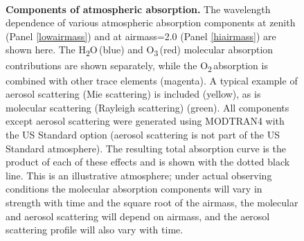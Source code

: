 \documentclass[12pt,preprint]{aastex}
\newcommand{\water}   {H\textsubscript{2}O}
\newcommand{\ozone}    {O\textsubscript{3}}
\newcommand{\oxy}     {O\textsubscript{2}}
\begin{document}
\begin{figure}[htpb]
\centering
{}\\
\vspace{-10pt}
\caption{{\small
{\bf Components of atmospheric absorption.} The wavelength dependence
of  various atmospheric absorption components at zenith
(Panel \ref{lowairmass}) and at airmass=2.0 (Panel \ref{hiairmass}) are shown here.  The \water\,(blue) and
\ozone\,(red) molecular absorption contributions are shown separately,
while the \oxy\,absorption is combined with other trace elements
(magenta). A typical example of aerosol scattering (Mie scattering) is
included (yellow), as is molecular scattering (Rayleigh scattering)
(green). All components except aerosol scattering were generated using
MODTRAN4 with the US Standard option (aerosol scattering is not part
of the US Standard atmosphere). The resulting total absorption curve
is the product of each of these effects and is shown with the dotted
black line. This is an illustrative atmosphere; under actual observing
conditions the molecular absorption components will vary in strength
with time and the square root of the airmass, the molecular and
aerosol scattering will depend on airmass, and the aerosol scattering
profile will also vary with time.}}
\label{fig:absorption_comps}
\end{figure}
\end{document}
